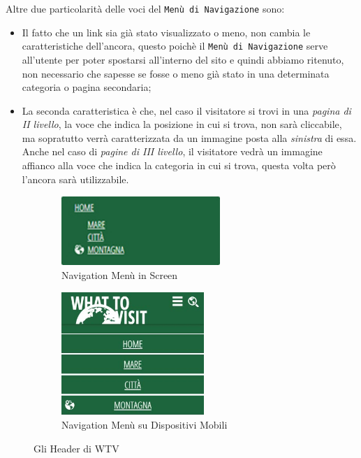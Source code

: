 Altre due particolarità delle voci del \texttt{Menù di Navigazione} sono:
\begin{itemize}
\item Il fatto che un link sia già stato visualizzato o meno, non cambia le caratteristiche dell'ancora, questo poichè il \texttt{Menù di Navigazione} serve all'utente per poter spostarsi all'interno del sito e quindi abbiamo ritenuto, non necessario che sapesse se fosse o meno già stato in una determinata categoria o pagina secondaria;
\item La seconda caratteristica è che, nel caso il visitatore si trovi in una \textit{pagina di II livello}, la voce che indica la posizione in cui si trova, non sarà cliccabile, ma sopratutto verrà caratterizzata da un immagine posta alla \textit{sinistra} di essa. Anche nel caso di \textit{pagine di III livello}, il visitatore vedrà un immagine affianco alla voce che indica la categoria in cui si trova, questa volta però l'ancora sarà utilizzabile.
\end{itemize}
\begin{figure}[h!]
        \centering
        \begin{subfigure}[b]{0.3\textwidth}
                \includegraphics[height=2.63cm,width=6cm]{images/pres_nav.jpg}
                \caption{Navigation Menù in Screen}
                \label{fig:Nav-screen}
        \end{subfigure}
        \hspace{4cm}
        \begin{subfigure}[b]{0.3\textwidth}
                \includegraphics[height=4.65cm,width=5.4cm]{images/pres_nav_m.jpg}
                \caption{Navigation Menù su Dispositivi Mobili}
                \label{fig:Nav-mobile}
        \end{subfigure}
        \caption{Gli Header di WTV}\label{fig:Display-Header}
\end{figure}

